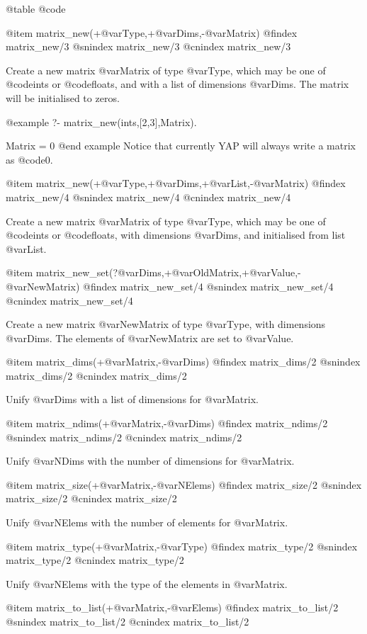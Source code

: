 {{{{{{{{{@table @code

@item matrix_new(+@var{Type},+@var{Dims},-@var{Matrix})
@findex matrix_new/3
@snindex matrix_new/3
@cnindex matrix_new/3

Create a new matrix @var{Matrix} of type @var{Type}, which may be one of
@code{ints} or @code{floats}, and with a list of dimensions @var{Dims}.
The matrix will be initialised to zeros.

@example
?- matrix_new(ints,[2,3],Matrix).

Matrix = 0
@end example
Notice that currently YAP will always write a matrix as @code{0}.

@item matrix_new(+@var{Type},+@var{Dims},+@var{List},-@var{Matrix})
@findex matrix_new/4
@snindex matrix_new/4
@cnindex matrix_new/4

Create a new matrix @var{Matrix} of type @var{Type}, which may be one of
@code{ints} or @code{floats}, with dimensions @var{Dims}, and
initialised from list @var{List}.

@item matrix_new_set(?@var{Dims},+@var{OldMatrix},+@var{Value},-@var{NewMatrix})
@findex matrix_new_set/4
@snindex matrix_new_set/4
@cnindex matrix_new_set/4

Create a new matrix @var{NewMatrix} of type @var{Type}, with dimensions
@var{Dims}. The elements of @var{NewMatrix} are set to @var{Value}.

@item matrix_dims(+@var{Matrix},-@var{Dims})
@findex matrix_dims/2
@snindex matrix_dims/2
@cnindex matrix_dims/2

Unify @var{Dims} with a list of dimensions for @var{Matrix}.

@item matrix_ndims(+@var{Matrix},-@var{Dims})
@findex matrix_ndims/2
@snindex matrix_ndims/2
@cnindex matrix_ndims/2

Unify @var{NDims} with the number of dimensions for @var{Matrix}.

@item matrix_size(+@var{Matrix},-@var{NElems})
@findex matrix_size/2
@snindex matrix_size/2
@cnindex matrix_size/2

Unify @var{NElems} with the number of elements for @var{Matrix}.

@item matrix_type(+@var{Matrix},-@var{Type})
@findex matrix_type/2
@snindex matrix_type/2
@cnindex matrix_type/2

Unify @var{NElems} with the type of the elements in @var{Matrix}.

@item matrix_to_list(+@var{Matrix},-@var{Elems})
@findex matrix_to_list/2
@snindex matrix_to_list/2
@cnindex matrix_to_list/2

}}}}}}}}}
